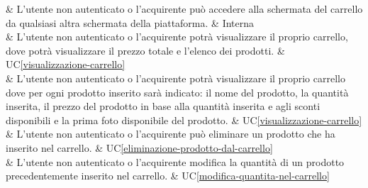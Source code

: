  & L'utente non autenticato o l'acquirente può accedere alla schermata del carrello da qualsiasi altra schermata della piattaforma. & Interna \\

 & L'utente non autenticato o l'acquirente potrà visualizzare il proprio carrello, dove potrà visualizzare il prezzo totale e l'elenco dei prodotti. & UC\ref{visualizzazione-carrello} \\

 & L'utente non autenticato o l'acquirente potrà visualizzare il proprio carrello dove per ogni prodotto inserito sarà indicato: il nome del prodotto, la quantità inserita, il prezzo del prodotto in base alla quantità inserita e agli sconti disponibili e la prima foto disponibile del prodotto. & UC\ref{visualizzazione-carrello} \\

 & L'utente non autenticato o l'acquirente può eliminare un prodotto che ha inserito nel carrello. & UC\ref{eliminazione-prodotto-dal-carrello} \\

 & L'utente non autenticato o l'acquirente modifica la quantità di un prodotto precedentemente inserito nel carrello. & UC\ref{modifica-quantita-nel-carrello} \\

